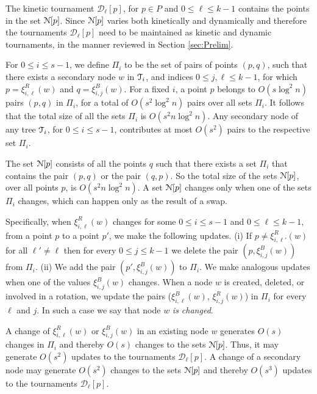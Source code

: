 \documentclass[letter,11pt]{article}
\def\NN{\EuScript{N}}
\def\dirtour{{\mathcal D}}
\def\T{\EuScript{T}}
\begin{document}
\smallskip

\noindent{\bf The tournaments $\dirtour_\ell[p]$.}
The kinetic tournament $\dirtour_\ell[p]$, for $p\in P$ and $0\leq
\ell\leq k-1$ contains the points in the set $\NN[p]$.  Since $\NN[p]$
varies both kinetically and dynamically and therefore the tournaments
$\dirtour_\ell[p]$ need to be maintained as kinetic and dynamic tournaments, in the manner reviewed in Section \ref{sec:Prelim}. 

For $0\leq i\leq s-1$, we define $\Pi_{i}$ to be
the set of pairs of points $(p,q)$, such that there exists a
secondary node $w$ in $\T_i$, and indices $0\leq j,\ell\leq k-1$, for which
$p=\xi_{i,\ell}^R(w)$ and $q=\xi_{i,j}^B(w)$.
For a fixed $i$, a point $p$ belongs to $O(s\log^2n)$ pairs $(p,q)$ in
$\Pi_{i}$, for a total of $O(s^2\log^2n)$ pairs over all sets $\Pi_{i}$.  It follows that the total size of all the
sets $\Pi_i$ is $O(s^2n\log^2n)$.  Any secondary node of any tree
$\T_i$, for $0\leq i\leq s-1$, contributes at most $O(s^2)$ pairs to
the respective set $\Pi_{i}$.


The set $\NN[p]$ consists of all the points $q$ such that there exists a set
$\Pi_{i}$ that contains the pair $(p,q)$ or the pair $(q,p)$.  So the
total size of the sets $\NN[p]$, over all points $p$, is $O(s^2 n\log^2
n)$. A set $\NN[p]$ changes only when one of the sets $\Pi_{i}$ changes,
which can happen only as the result of a swap.

Specifically, when $\xi_{i,\ell}^R(w)$ changes for some $0\leq i\le
s-1$ and $0\le \ell \leq k-1$, from a point $p$ to a point $p'$, we
make the following updates.  
(i) If $p\not= \xi_{i,\ell'}^R(w)$ for all
$\ell' \not= \ell$ then for every $0\le j \le k-1$ we delete the pair
$(p,\xi_{i,j}^B(w))$ from $\Pi_{i}$. (ii) We add the
pair $(p',\xi_{i,j}^B(w))$ to $\Pi_{i}$.  We make analogous updates
when one of the values $\xi_{i,j}^B(w)$ changes.  When a node $w$ is created, deleted,
or involved in a rotation, we update the pairs ($\xi_{i,\ell}^B(w)$,
$\xi_{i,j}^R(w)$) in $\Pi_i$ for every $\ell$ and $j$. In such a case
we say that node $w$ {\em is changed}.

A change of $\xi_{i,\ell}^R(w)$ or $\xi_{i,j}^B(w)$ in an existing
node $w$ generates $O(s)$ changes in $\Pi_{i}$ and thereby $O(s)$
changes to the sets $\NN[p]$.  Thus, it may generate $O(s^2)$ updates to the
tournaments $\dirtour_\ell[p]$. A change of a secondary node may
generate $O(s^2)$ changes to the sets $\NN[p]$ and thereby $O(s^3)$ updates
to the tournaments $\dirtour_\ell[p]$.
\end{document}
